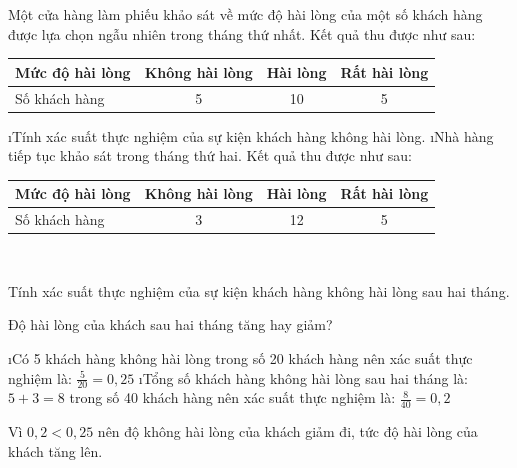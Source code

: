 \begin{bt}
	Một cửa hàng làm phiếu khảo sát về mức độ hài lòng của một số khách hàng được lựa chọn ngẫu nhiên trong tháng thứ nhất. Kết quả thu được như sau:
	\begin{center}
		\begin{tabular}{|l|c|c|c|}
			\hline
			Mức độ hài lòng&	Không hài lòng&	Hài lòng&	Rất hài lòng\\
			\hline
			Số khách hàng&	5&	10&	5\\
			\hline
		\end{tabular}
	\end{center}
	\begin{enumerate}[a),leftmargin=*]
		\i Tính xác suất thực nghiệm của sự kiện khách hàng không hài lòng.
		\i Nhà hàng tiếp tục khảo sát trong tháng thứ hai.  Kết quả thu được như sau:
		\begin{center}
			\begin{tabular}{|l|c|c|c|}
				\hline
				Mức độ hài lòng&	Không hài lòng&	Hài lòng&	Rất hài lòng\\
				\hline
				Số khách hàng&	3&	12&	5\\
				\hline
			\end{tabular}\,\,\,\,\,\,\,\,\,
		\end{center}
		Tính xác suất thực nghiệm của sự kiện khách hàng không hài lòng sau hai tháng.
		
		Độ hài lòng của khách sau hai tháng tăng hay giảm?
	\end{enumerate}
	
	\begin{loigiaichuong42}
		\begin{enumerate}[a),leftmargin=*]
			\i Có 5 khách hàng không hài lòng trong số 20 khách hàng nên xác suất thực nghiệm là: $\frac{5}{{20}} = 0,25$
			\i Tổng số khách hàng không hài lòng sau hai tháng là: $5 + 3 = 8$ trong số 40 khách hàng nên xác suất thực nghiệm là:   $\frac{8}{{40}} = 0,2$
			
			Vì $0,2 < 0,25$ nên độ không hài lòng của khách giảm đi, tức độ hài lòng của khách tăng lên.
		\end{enumerate}
	\end{loigiaichuong42}
\end{bt}
